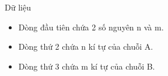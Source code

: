 Dữ liệu  
\begin{itemize}
	\item     Dòng đầu tiên chứa 2 số nguyên n và m.   
	\item     Dòng thứ 2 chứa n kí tự của chuỗi A.   
	\item     Dòng thứ 3 chứa m kí tự của chuỗi B.   
\end{itemize}